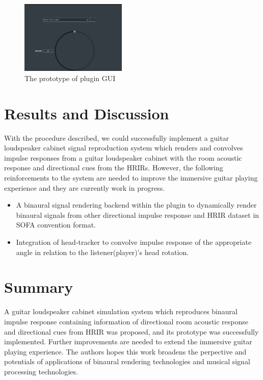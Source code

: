 \documentclass[convention,e-brief]{aesconf-current}
\begin{document}
\begin{figure}
    \centering
    \includegraphics[width=0.45\textwidth]{./fig/gui.png}
    \caption{The prototype of plugin GUI}
    \label{fig:gui}
\end{figure}

\section{Results and Discussion}
With the procedure described, we could successfully implement a guitar loudspeaker cabinet signal reproduction system which renders and convolves impulse responses from a guitar loudspeaker cabinet with the room acoustic response and directional cues from the HRIRs.
However, the following reinforcements to the system are needed to improve the immersive guitar playing experience and they are currently work in progress.

\begin{itemize}
    \item A binaural signal rendering backend within the plugin to dynamically render binaural signals from other directional impulse response and HRIR dataset in SOFA convention format.
    \item Integration of head-tracker to convolve impulse response of the appropriate angle in relation to the listener(player)'s head rotation.
\end{itemize}

\section{Summary}

A guitar loudspeaker cabinet simulation system which reproduces binaural impulse response containing information of directional room acoustic response and directional cues from HRIR was proposed, and its prototype was successfully implemented.
Further improvements are needed to extend the immersive guitar playing experience.
The authors hopes this work broadens the perpective and potentials of applications of binaural rendering technologies and musical signal processing technologies.






\end{document}
